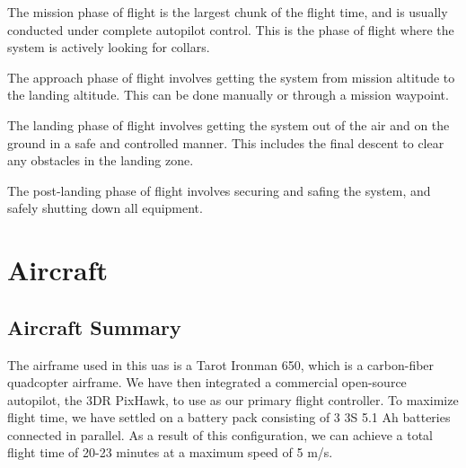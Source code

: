 \documentclass{report}
\begin{document}
			The mission phase of flight is the largest chunk of the flight time, and is usually conducted under complete autopilot control.  This is the phase of flight where the system is actively looking for collars.

			The approach phase of flight involves getting the system from mission altitude to the landing altitude.  This can be done manually or through a mission waypoint.

			The landing phase of flight involves getting the system out of the air and on the ground in a safe and controlled manner.  This includes the final descent to clear any obstacles in the landing zone.

			The post-landing phase of flight involves securing and safing the system, and safely shutting down all equipment.
	\section{Aircraft}
		\subsection{Aircraft Summary}
			The airframe used in this \gls{uas} is a Tarot Ironman 650, which is a carbon-fiber \gls{quadcopter} airframe.  We have then integrated a commercial open-source autopilot, the 3DR PixHawk, to use as our primary flight controller.  To maximize flight time, we have settled on a battery pack consisting of 3 3S 5.1 Ah batteries connected in parallel.  As a result of this configuration, we can achieve a total flight time of 20-23 minutes at a maximum speed of 5 m/s.
\end{document}

